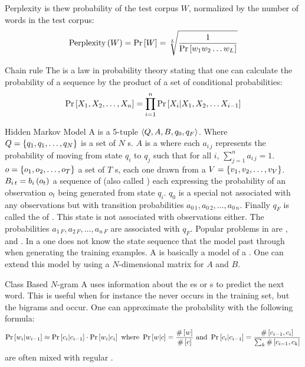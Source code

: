 \begin{df}{Perplexity}
\sb{} is thew probability of the test corpus $W$, normalized by the number of words in the test corpus:
\begin{equation}
\mbox{Perplexity}\left(W\right)=\Pr\left[W\right]=\sqrt[L]{\displaystyle\frac{1}{\Pr\left[w_1w_2\ldots w_L\right]}}
\end{equation}
\end{df}
\begin{df}{Chain rule}
The \sb{} is a law in probability theory stating that one can calculate the probability of a sequence by the product of a set of conditional probabilities:
\begin{equation}
\Pr\left[X_1,X_2,\ldots,X_n\right]=\displaystyle\prod_{i=1}^{n}\Pr\left[X_i|X_1,X_2,\ldots X_{i-1}\right]
\end{equation}
\end{df}
\begin{df}{Hidden Markov Model}
A \sb{} is a 5-tuple $\left\langle Q,A,B,q_0,q_F\right\rangle$. Where $Q=\left\{q_1,q_1,\ldots,q_N\right\}$ is a set of $N$ s. $A$ is a  where each $a_{i\,j}$ represents the probability of moving from state $q_i$ to $q_j$ such that for all $i$, $\sum_{j=1}^{n}{a_{i\,j}}=1$. $o=\left\{o_1,o_2,\ldots,o_T\right\}$ a set of $T$ s, each one drawn from a  $V=\left\{v_1,v_2,\ldots,v_V\right\}$. $B_{i\,t}=b_i\left(o_t\right)$ a sequence of  (also called ) each expressing the probability of an observation $o_t$ being generated from state $q_i$. $q_0$ is a special  not associated with any observations but with transition probabilities $a_{0\,1},a_{0\,2},\ldots,a_{0\,n}$. Finally $q_F$ is called the  of . This state is not associated with observations either. The probabilities $a_{1\,F},a_{2\,F},\ldots,a_{n\,F}$ are associated with $q_F$. Popular problems in \sb{} are ,  and . In a \sb{} one does not know the state sequence that the model past through when generating the training examples. A \sb{} is basically a model of a . One can extend this model by using a $N$-dimensional matrix for $A$ and $B$.
\end{df}
\begin{df}{Class Based $N$-gram}
A \sb{} uses information about the es or s to predict the next word. This is useful when for instance the  never occurs in the training set, but the bigrams  and  occur. One can approximate the probability with the following formula:
\begin{equation}
\Pr\left[w_i|w_{i-1}\right]\approx\Pr\left[c_i|c_{i-1}\right]\cdot\Pr\left[w_i|c_i\right]\mbox{ where }\Pr\left[w|c\right]=\displaystyle\frac{\#\left[w\right]}{\#\left[c\right]}\mbox{ and }\Pr\left[c_i|c_{i-1}\right]=\displaystyle\frac{\#\left[c_{i-1},c_i\right]}{\sum_k\#\left[c_{i-1},c_k\right]}
\end{equation}
\sb{} are often mixed with regular .
\end{df}
